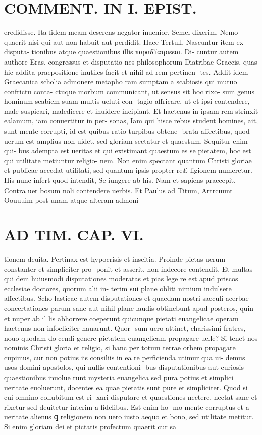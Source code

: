 \documentclass{article}
\begin{document}
\begin{pages}
\section*{COMMENT. IN I. EPIST. }\pstart eredidisse. Ita fidem meam deserens negator inuenior. Semel dixerim, Nemo quaerit nisi qui aut non habuit aut perdidit. Haec Tertull. Nascuntur item ex disputa- tionibus atque quaestionibus illis παραδ'ίατριssαι. Di- cuntur autem authore Eras. congressus et disputatio nes philosophorum Diatribae Graecis, quas hic addita praepositione inutiles facit et nihil ad rem pertinen- tes. Addit idem Graecanica scholia admonere metapho ram sumptam a scabiosis qui mutuo confrictu conta- ctuque morbum communicant, ut sensus sit hoc rixo- sum genus hominum scabiem suam multis ueluti con- tagio affricare, ut et ipsi contendere, male suspicari, maledicere et inuidere incipiant. Et hactenus in ipsam rem strinxit ealamum, iam conuertitur in per- sonas, Iam qui hisce rebus student homines, ait, sunt mente corrupti, id est quibus ratio turpibus obtene- brata affectibus, quod uerum est amplius non uidet, sed gloriam sectatur et quaestum. Sequitur enim qui- bus adempta est ueritas et qui existimant quaestum es se pietatem, hoc est qui utilitate metiuntur religio- nem. Non enim spectant quantum Christi gloriae et publicae accedat utilitati, sed quantum ipsis propter re£ ligionem numeretur. His nunc infert quod intendit, Se iungere ab his. Nam et sapiens praecepit, Contra uer bosum noli contendere uerbis. Et Paulus ad Titum, Artrcuunt Oouuuim post unam atque alteram admoni  \pend
\section*{AD TIM. CAP. VI. }
\marginpar{[ p.167 ]}\pstart tionem deuita. Pertinax est hypocrisis et inscitia. Proinde pietas uerum constanter et simpliciter pro- ponit et asserit, non indecore contendit. Et multas qui dem huiusmodi disputationes moderatas et pias lege re est apud priscos ecclesiae doctores, quorum alii in- terim sui plane obliti nimium indulsere affectibus. Scho lasticae autem disputationes et quaedam nostri saeculi acerbae concertationes parum sane aut nihil plane laudis obtinebunt apud posteros, quin et nuper ab il lis abhorrere coeperunt quicunque pietati euangelicae operam hactenus non infoeliciter nauarunt. Quor- sum uero attinet, charissimi fratres, nouo quodam do cendi genere pietatem euangelicam propagare uelle? Si tenet nos nominis Christi gloria et religio, si hanc per totum terrae orbem propagare cupimus, cur non potius iis consiliis in ea re perficienda utimur qua ui- demus usos domini apostolos, qui nullis contentioni- bus disputationibus aut curiosis quaestionibus inuolue runt mysteria euangelica sed pura potius et simplici ueritate euoluerunt, docentes ea quae pietatis sunt pure et simpliciter. Quod si cui omnino collubitum est ri- xari disputare et quaestiones nectere, nectat sane et rixetur sed deuitetur interim a fidelibus. Est enim ho- mo mente corruptus et a ueritate alienus ꝗ religionem non uero iusto aequo et bono, sed utilitate metitur. Si enim gloriam dei et pictatis profectum quaerit cur sa  \pend

\end{pages}
\end{document}
